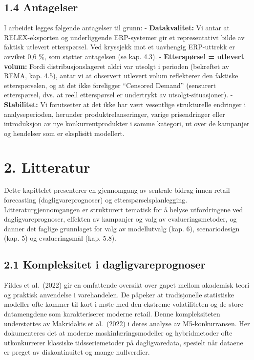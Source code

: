 \documentclass[
  norsk,
  11pt,
  a4paper,
]{article}
\begin{document}
\subsection{1.4 Antagelser}\label{antagelser}

I arbeidet legges følgende antagelser til grunn: -
\textbf{Datakvalitet:} Vi antar at RELEX-eksporten og underliggende
ERP-systemer gir et representativt bilde av faktisk utlevert
etterspørsel. Ved kryssjekk mot et uavhengig ERP-uttrekk er avviket 0,6
\%, som støtter antagelsen (se kap. 4.3). - \textbf{Etterspørsel =
utlevert volum:} Fordi distribusjonslageret aldri var utsolgt i perioden
(bekreftet av REMA, kap. 4.5), antar vi at observert utlevert volum
reflekterer den faktiske etterspørselen, og at det ikke foreligger
``Censored Demand'' (sensurert etterspørsel, dvs. at reell etterspørsel
er undertrykt av utsolgt-situasjoner). - \textbf{Stabilitet:} Vi
forutsetter at det ikke har vært vesentlige strukturelle endringer i
analyseperioden, herunder produktrelanseringer, varige prisendringer
eller introduksjon av nye konkurrentprodukter i samme kategori, ut over
de kampanjer og hendelser som er eksplisitt modellert.

\section{2. Litteratur}\label{litteratur}

Dette kapittelet presenterer en gjennomgang av sentrale bidrag innen
retail forecasting (dagligvareprognoser) og etterspørselsplanlegging.
Litteraturgjennomgangen er strukturert tematisk for å belyse
utfordringene ved dagligvareprognoser, effekten av kampanjer og valg av
evalueringsmetoder, og danner det faglige grunnlaget for valg av
modellutvalg (kap. 6), scenariodesign (kap. 5) og evalueringsmål (kap.
5.8).

\subsection{2.1 Kompleksitet i
dagligvareprognoser}\label{kompleksitet-i-dagligvareprognoser}

Fildes et al.~(2022) gir en omfattende oversikt over gapet mellom
akademisk teori og praktisk anvendelse i varehandelen. De påpeker at
tradisjonelle statistiske modeller ofte kommer til kort i møte med den
ekstreme volatiliteten og de store datamengdene som karakteriserer
moderne retail. Denne kompleksiteten understøttes av Makridakis et
al.~(2022) i deres analyse av M5-konkurransen. Her dokumenteres det at
moderne maskinlæringsmodeller og hybridmetoder ofte utkonkurrerer
klassiske tidsseriemetoder på dagligvaredata, spesielt når dataene er
preget av diskontinuitet og mange nullverdier.
\end{document}
